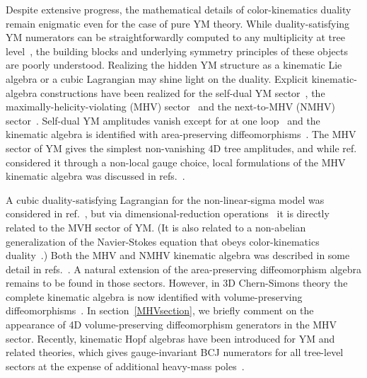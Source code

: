\documentclass[11pt,a4paper]{article}
\begin{document}
Despite extensive progress, the mathematical details of color-kinematics duality remain enigmatic even for the case of pure YM theory. While duality-satisfying YM numerators can be straightforwardly computed to any multiplicity at tree level~\cite{BjerrumBohr:2010hn,Mafra:2011kj,Mafra:2015vca,Bjerrum-Bohr:2016axv,Du:2017kpo,Chen:2017bug,Fu:2018hpu,Edison:2020ehu,Hou:2021mvg,Cheung:2021zvb,Brandhuber:2021bsf,Brandhuber:2022enp,Cao:2022vou}, the building blocks and underlying symmetry principles of these objects are poorly understood. Realizing the hidden YM structure as a kinematic Lie algebra or a cubic Lagrangian may shine light on the duality. Explicit kinematic-algebra constructions have been realized for the self-dual YM sector~\cite{Monteiro:2011pc,Boels:2013bi,Monteiro:2022lwm}, the maximally-helicity-violating (MHV) sector~\cite{Monteiro:2011pc,Cheung:2016prv,Chen:2019ywi} and the next-to-MHV (NMHV) sector~\cite{Chen:2019ywi,Chen:2021chy}. 
Self-dual YM amplitudes vanish except for at one loop~\cite{Cangemi:1996rx} and the kinematic algebra is identified with area-preserving diffeomorphisms~\cite{Monteiro:2011pc}. The MHV sector of YM gives the simplest non-vanishing 4D tree amplitudes, and while ref.~\cite{Monteiro:2011pc} considered it through a non-local gauge choice, local formulations of the MHV kinematic algebra was discussed in refs.~\cite{Cheung:2016prv,Chen:2019ywi}. 

A cubic duality-satisfying Lagrangian for the  non-linear-sigma model was considered in ref.~\cite{Cheung:2016prv}, but via dimensional-reduction operations~\cite{Cheung:2017yef,Cheung:2017ems} it is directly related to the MVH sector of YM. (It is also related to a non-abelian generalization of the Navier-Stokes equation that obeys color-kinematics duality~\cite{Cheung:2020djz,Keeler:2020rcv,Escudero:2022zdz}.) Both the MHV and NMHV kinematic algebra was described in some detail in refs.~\cite{Chen:2019ywi,Chen:2021chy}. A natural extension of the area-preserving diffeomorphism algebra remains to be found in those sectors. However, in 3D Chern-Simons theory the complete kinematic algebra is now identified with volume-preserving diffeomorphisms~\cite{Ben-Shahar:2021zww}. In section~\ref{MHVsection}, we briefly comment on the appearance of 4D volume-preserving diffeomorphism generators in the MHV sector. Recently, kinematic Hopf algebras have been introduced for YM and related theories, which gives gauge-invariant BCJ numerators for all tree-level sectors at the expense of additional heavy-mass poles~\cite{Cheung:2021zvb,Brandhuber:2021kpo,Brandhuber:2021eyq,Brandhuber:2021bsf,Chen:2022nei,Brandhuber:2022enp,Cao:2022vou}.
\end{document}
